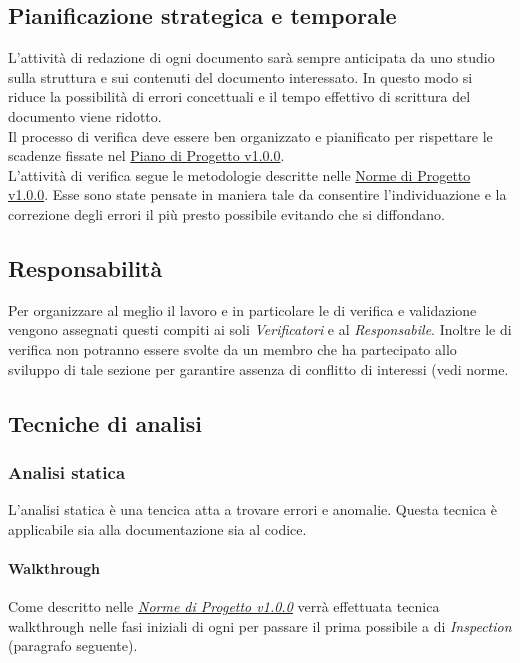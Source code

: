\documentclass{scalatekids-article}
\begin{document}
\subsection{Pianificazione strategica e temporale}
L'attività di redazione di ogni documento sarà sempre anticipata da uno studio sulla struttura e sui contenuti del documento interessato. In questo modo si riduce la possibilità di errori concettuali e il tempo effettivo di scrittura del documento viene ridotto.\\
Il processo di verifica deve essere ben organizzato e pianificato per rispettare le scadenze fissate nel \href{run:./PianoDiProgetto\_v1.0.0.pdf}{Piano di Progetto v1.0.0}.\\
L'attività di verifica segue le metodologie descritte nelle \href{run:../Interni/NormeDiProgetto\_v1.0.0.pdf}{Norme di Progetto v1.0.0}. Esse sono state pensate in maniera tale da consentire l'individuazione e la correzione degli errori il più presto possibile evitando che si diffondano.
\subsection{Responsabilità}
Per organizzare al meglio il lavoro e in particolare le  di verifica e validazione vengono assegnati questi compiti ai soli \textit{Verificatori} e al \textit{Responsabile}. Inoltre le  di verifica non potranno essere svolte da un membro che ha partecipato allo sviluppo di tale sezione per garantire assenza di conflitto di interessi (vedi norme.
\subsection{Tecniche di analisi}
\label{sec:TecnicheDiAnalisi}
\subsubsection{Analisi statica}
L'analisi statica è una tencica atta a trovare errori e anomalie. Questa tecnica è applicabile sia alla documentazione sia al codice.
\paragraph{Walkthrough}
\label{sec:walkthrough}Come descritto nelle \textit{\href{run:../Interni/NormeDiProgetto_v1.0.0.pdf}{Norme di Progetto v1.0.0}} verrà effettuata tecnica walkthrough nelle fasi iniziali di ogni  per passare il prima possibile a  di \textit{Inspection} (paragrafo seguente).
\end{document}
